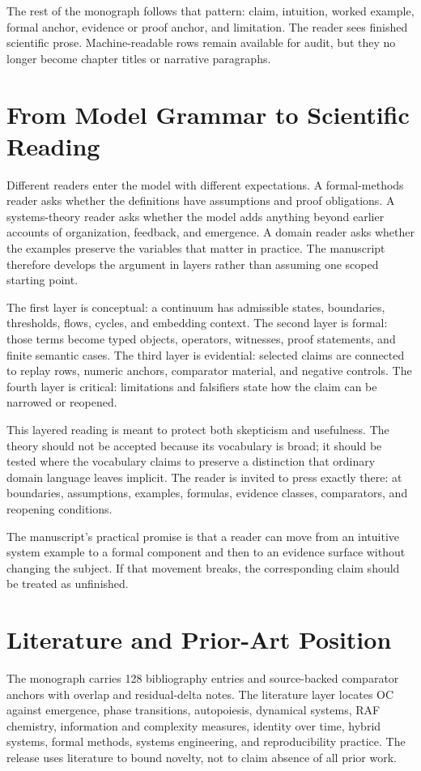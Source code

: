 The rest of the monograph follows that pattern: claim, intuition, worked example, formal anchor, evidence or proof anchor, and limitation. The reader sees finished scientific prose. Machine-readable rows remain available for audit, but they no longer become chapter titles or narrative paragraphs.


\section{From Model Grammar to Scientific Reading}
\label{sec:oc133-reader-contract-scientific-route}
Different readers enter the model with different expectations. A formal-methods reader asks whether the definitions have assumptions and proof obligations. A systems-theory reader asks whether the model adds anything beyond earlier accounts of organization, feedback, and emergence. A domain reader asks whether the examples preserve the variables that matter in practice. The manuscript therefore develops the argument in layers rather than assuming one scoped starting point.

The first layer is conceptual: a continuum has admissible states, boundaries, thresholds, flows, cycles, and embedding context. The second layer is formal: those terms become typed objects, operators, witnesses, proof statements, and finite semantic cases. The third layer is evidential: selected claims are connected to replay rows, numeric anchors, comparator material, and negative controls. The fourth layer is critical: limitations and falsifiers state how the claim can be narrowed or reopened.

This layered reading is meant to protect both skepticism and usefulness. The theory should not be accepted because its vocabulary is broad; it should be tested where the vocabulary claims to preserve a distinction that ordinary domain language leaves implicit. The reader is invited to press exactly there: at boundaries, assumptions, examples, formulas, evidence classes, comparators, and reopening conditions.

The manuscript's practical promise is that a reader can move from an intuitive system example to a formal component and then to an evidence surface without changing the subject. If that movement breaks, the corresponding claim should be treated as unfinished.


\section{Literature and Prior-Art Position}
\label{sec:oc133-literature-prior-art-position}
The monograph carries 128 bibliography entries and source-backed comparator anchors with overlap and residual-delta notes. The literature layer locates OC against emergence, phase transitions, autopoiesis, dynamical systems, RAF chemistry, information and complexity measures, identity over time, hybrid systems, formal methods, systems engineering, and reproducibility practice. The release uses literature to bound novelty, not to claim absence of all prior work.

